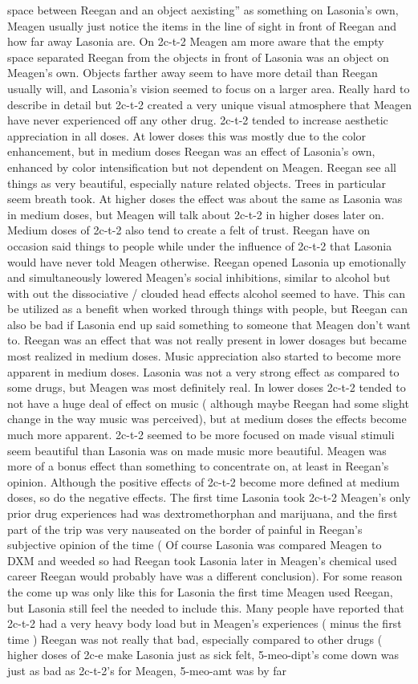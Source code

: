 \documentclass[12pt]{book}
\begin{document}
space between Reegan and an object aexisting'' as something on Lasonia's own, Meagen usually just notice the items in the line of sight in front of Reegan and how far away Lasonia are. On 2c-t-2 Meagen am more aware that the empty space separated Reegan from the objects in front of Lasonia was an object on Meagen's own. Objects farther away seem to have more detail than Reegan usually will, and Lasonia's vision seemed to focus on a larger area. Really hard to describe in detail but 2c-t-2 created a very unique visual atmosphere that Meagen have never experienced off any other drug. 2c-t-2 tended to increase aesthetic appreciation in all doses. At lower doses this was mostly due to the color enhancement, but in medium doses Reegan was an effect of Lasonia's own, enhanced by color intensification but not dependent on Meagen. Reegan see all things as very beautiful, especially nature related objects. Trees in particular seem breath took. At higher doses the effect was about the same as Lasonia was in medium doses, but Meagen will talk about 2c-t-2 in higher doses later on. Medium doses of 2c-t-2 also tend to create a felt of trust. Reegan have on occasion said things to people while under the influence of 2c-t-2 that Lasonia would have never told Meagen otherwise. Reegan opened Lasonia up emotionally and simultaneously lowered Meagen's social inhibitions, similar to alcohol but with out the dissociative / clouded head effects alcohol seemed to have. This can be utilized as a benefit when worked through things with people, but Reegan can also be bad if Lasonia end up said something to someone that Meagen don't want to. Reegan was an effect that was not really present in lower dosages but became most realized in medium doses. Music appreciation also started to become more apparent in medium doses. Lasonia was not a very strong effect as compared to some drugs, but Meagen was most definitely real. In lower doses 2c-t-2 tended to not have a huge deal of effect on music ( although maybe Reegan had some slight change in the way music was perceived), but at medium doses the effects become much more apparent. 2c-t-2 seemed to be more focused on made visual stimuli seem beautiful than Lasonia was on made music more beautiful. Meagen was more of a bonus effect than something to concentrate on, at least in Reegan's opinion. Although the positive effects of 2c-t-2 become more defined at medium doses, so do the negative effects. The first time Lasonia took 2c-t-2 Meagen's only prior drug experiences had was dextromethorphan and marijuana, and the first part of the trip was very nauseated on the border of painful in Reegan's subjective opinion of the time ( Of course Lasonia was compared Meagen to DXM and weeded so had Reegan took Lasonia later in Meagen's chemical used career Reegan would probably have was a different conclusion). For some reason the come up was only like this for Lasonia the first time Meagen used Reegan, but Lasonia still feel the needed to include this. Many people have reported that 2c-t-2 had a very heavy body load but in Meagen's experiences ( minus the first time ) Reegan was not really that bad, especially compared to other drugs ( higher doses of 2c-e make Lasonia just as sick felt, 5-meo-dipt's come down was just as bad as 2c-t-2's for Meagen, 5-meo-amt was by far 
\end{document}

